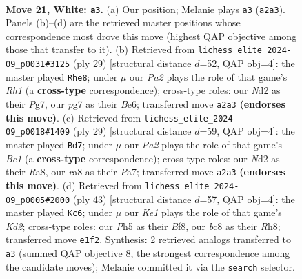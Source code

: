 \documentclass[11pt]{article}
\begin{document}
\clearpage

\begin{figure}[p]\centering
\begin{subfigure}{0.46\textwidth}\centering
\resizebox{\linewidth}{!}{%
\newchessgame
\chessboard[
  setfen={rnb1k1r1/pp2b1pp/8/3pPp1P/8/6P1/P2NN3/R1B1K2R w KQ - 1 21},
  showmover=false,
  pgfstyle=straightmove, color=movearrow, markmove={a2-a3}
]}
\caption{}
\end{subfigure}\hfill
\begin{subfigure}{0.46\textwidth}\centering
\resizebox{\linewidth}{!}{%
\newchessgame
\chessboard[
  setfen={r6r/p1p1kppp/4b3/3n4/N7/PP6/2P2PPP/R1B1K2R b KQ - 2 15},
  showmover=false,
  pgfstyle=straightmove, color=movearrow, markmove={h8-e8}
]}
\caption{}
\end{subfigure}
\\[4pt]
\begin{subfigure}{0.46\textwidth}\centering
\resizebox{\linewidth}{!}{%
\newchessgame
\chessboard[
  setfen={r1br2k1/pp4pp/4p3/2p1n3/4P3/2P5/PP2B1PP/R3K1NR b KQ - 2 15},
  showmover=false,
  pgfstyle=straightmove, color=movearrow, markmove={c8-d7}
]}
\caption{}
\end{subfigure}\hfill
\begin{subfigure}{0.46\textwidth}\centering
\resizebox{\linewidth}{!}{%
\newchessgame
\chessboard[
  setfen={3r1b1r/3k1p2/7p/1Nn1P1p1/2p5/6B1/1P3PPP/R3K2R b KQ - 0 22},
  showmover=false,
  pgfstyle=straightmove, color=movearrow, markmove={d7-c6}
]}
\caption{}
\end{subfigure}
\caption{\textbf{Move 21, White: \texttt{a3}.} (a) Our position; Melanie plays \texttt{a3} (\texttt{a2a3}). Panels (b)--(d) are the retrieved master positions whose correspondence most drove this move (highest QAP objective among those that transfer to it). (b) Retrieved from \texttt{lichess\_elite\_2024-09\_p0031\#3125} (ply 29) [structural distance $d$=52, QAP obj=4]: the master played \texttt{Rhe8}; under $\mu$ our \emph{Pa2} plays the role of that game's \emph{Rh1} (a \textbf{cross-type} correspondence); cross-type roles: our \emph{N}d2 as their \emph{P}g7, our \emph{p}g7 as their \emph{B}e6; transferred move \texttt{a2a3} \textbf{(endorses this move)}. (c) Retrieved from \texttt{lichess\_elite\_2024-09\_p0018\#1409} (ply 29) [structural distance $d$=59, QAP obj=4]: the master played \texttt{Bd7}; under $\mu$ our \emph{Pa2} plays the role of that game's \emph{Bc1} (a \textbf{cross-type} correspondence); cross-type roles: our \emph{N}d2 as their \emph{R}a8, our \emph{r}a8 as their \emph{P}a7; transferred move \texttt{a2a3} \textbf{(endorses this move)}. (d) Retrieved from \texttt{lichess\_elite\_2024-09\_p0005\#2000} (ply 43) [structural distance $d$=57, QAP obj=4]: the master played \texttt{Kc6}; under $\mu$ our \emph{Ke1} plays the role of that game's \emph{Kd2}; cross-type roles: our \emph{P}h5 as their \emph{B}f8, our \emph{b}c8 as their \emph{R}h8; transferred move \texttt{e1f2}. Synthesis: 2 retrieved analogs transferred to \texttt{a3} (summed QAP objective 8, the strongest correspondence among the candidate moves); Melanie committed it via the \texttt{search} selector.}
\label{fig:thought-m40}
\end{figure}
\end{document}
